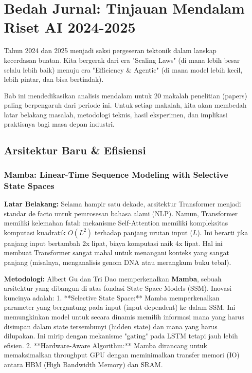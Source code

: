 \chapter{Bedah Jurnal: Tinjauan Mendalam Riset AI 2024-2025}
\label{chap:lit_review}

Tahun 2024 dan 2025 menjadi saksi pergeseran tektonik dalam lanskap kecerdasan buatan. Kita bergerak dari era "Scaling Laws" (di mana lebih besar selalu lebih baik) menuju era "Efficiency \& Agentic" (di mana model lebih kecil, lebih pintar, dan bisa bertindak).

Bab ini mendedikasikan analisis mendalam untuk 20 makalah penelitian (papers) paling berpengaruh dari periode ini. Untuk setiap makalah, kita akan membedah latar belakang masalah, metodologi teknis, hasil eksperimen, dan implikasi praktisnya bagi masa depan industri.

\section{Arsitektur Baru \& Efisiensi}

\subsection{Mamba: Linear-Time Sequence Modeling with Selective State Spaces \cite{gu2023mamba}}

\textbf{Latar Belakang:}
Selama hampir satu dekade, arsitektur Transformer menjadi standar de facto untuk pemrosesan bahasa alami (NLP). Namun, Transformer memiliki kelemahan fatal: mekanisme Self-Attention memiliki kompleksitas komputasi kuadratik $O(L^2)$ terhadap panjang urutan input ($L$). Ini berarti jika panjang input bertambah 2x lipat, biaya komputasi naik 4x lipat. Hal ini membuat Transformer sangat mahal untuk menangani konteks yang sangat panjang (misalnya, menganalisis genom DNA atau merangkum buku tebal).

\textbf{Metodologi:}
Albert Gu dan Tri Dao memperkenalkan \textbf{Mamba}, sebuah arsitektur yang dibangun di atas fondasi State Space Models (SSM). Inovasi kuncinya adalah:
1.  **Selective State Space:** Mamba memperkenalkan parameter yang bergantung pada input (input-dependent) ke dalam SSM. Ini memungkinkan model untuk secara dinamis memilih informasi mana yang harus disimpan dalam state tersembunyi (hidden state) dan mana yang harus dilupakan. Ini mirip dengan mekanisme "gating" pada LSTM tetapi jauh lebih efisien.
2.  **Hardware-Aware Algorithm:** Mamba dirancang untuk memaksimalkan throughput GPU dengan meminimalkan transfer memori (IO) antara HBM (High Bandwidth Memory) dan SRAM.

